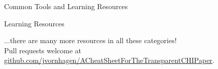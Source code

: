 \begin{block}{Common Tools and Learning Resources}
\begin{subblock}{ \hfill Learning Resources\hfill {}}
\end{subblock}

 ...there are many more resources in all these categories! \\Pull requests welcome at \href{https://github.com/jvornhagen/ACheatSheetForTheTransparentCHIPaper}{github.com/jvornhagen/ACheatSheetForTheTransparentCHIPaper}.   
   

\end{block}